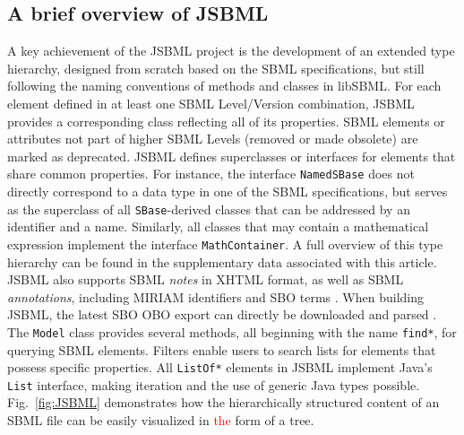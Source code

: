 \documentclass{bioinfo}
\begin{document}
\begin{methods}
\section{A brief overview of JSBML}

A key achievement of the JSBML project is the development of an extended type
hierarchy, designed from scratch based on the SBML specifications, but still
following the naming conventions of methods and classes in
libSBML. For each element defined in at least one SBML Level/Version combination,
JSBML provides a corresponding class reflecting all of its properties. SBML
elements or attributes not part of higher SBML Levels (removed or made
obsolete) are marked as deprecated. JSBML defines superclasses or interfaces for
elements that share common properties. For instance, the interface
\texttt{NamedSBase} does not directly correspond to a data type in one of the
SBML specifications, but serves as the superclass of all \texttt{SBase}-derived
classes that can be addressed by an identifier and a name. Similarly, all classes
that may contain a mathematical expression implement the
interface \texttt{MathContainer}. A full overview of this type hierarchy can be
found in the supplementary data associated with this article. JSBML also
supports SBML \emph{notes} in XHTML format, as well as SBML
\emph{annotations}, including MIRIAM identifiers \citep{Novere2005} and
SBO terms \citep{Novere2006b}.
When building JSBML, the latest SBO OBO export can directly be downloaded and
parsed \citep{Holland2008}.
The \texttt{Model} class provides several methods, all beginning with the name
\texttt{find*}, for querying SBML elements. Filters enable users to search lists
for elements that possess specific properties. All \texttt{ListOf*} elements in
JSBML implement Java's \texttt{List} interface, making iteration and the use of
generic Java types possible. Fig.~\ref{fig:JSBML} demonstrates how the
hierarchically structured content of an SBML file can be easily visualized in \textcolor{red}{the} form
of a tree.
\begin{figure}
\centerline{
  }
\end{figure}
\end{methods}
\end{document}
